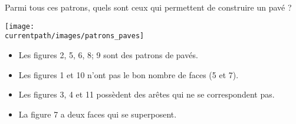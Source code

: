 \begin{exercice*}
   Parmi tous ces patrons, quels sont ceux qui permettent de construire un pavé ?
   \begin{center}
      \texttt{[image: \\currentpath/images/patrons\_paves]}
   \end{center}
\end{exercice*}
\begin{corrige}
   \begin{itemize}
      \item Les figures {\color{red} 2, 5, 6, 8; 9} sont des patrons de pavés.
      \item Les figures 1 et 10 n'ont pas le bon nombre de faces (5 et 7).
      \item Les figures 3, 4 et 11 possèdent des arêtes qui ne se correspondent pas.
      \item La figure 7 a deux faces qui se superposent.
   \end{itemize}
\end{corrige}
